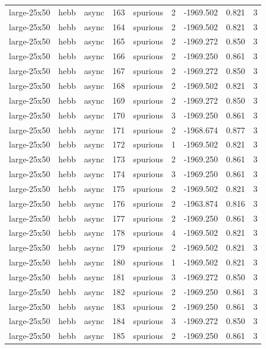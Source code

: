 \begin{tabular}{lllrlrrrr}
large-25x50 & hebb & async & 163 & spurious & 2 & -1969.502 & 0.821 & 3 \\
large-25x50 & hebb & async & 164 & spurious & 2 & -1969.502 & 0.821 & 3 \\
large-25x50 & hebb & async & 165 & spurious & 2 & -1969.272 & 0.850 & 3 \\
large-25x50 & hebb & async & 166 & spurious & 2 & -1969.250 & 0.861 & 3 \\
large-25x50 & hebb & async & 167 & spurious & 2 & -1969.272 & 0.850 & 3 \\
large-25x50 & hebb & async & 168 & spurious & 2 & -1969.502 & 0.821 & 3 \\
large-25x50 & hebb & async & 169 & spurious & 2 & -1969.272 & 0.850 & 3 \\
large-25x50 & hebb & async & 170 & spurious & 3 & -1969.250 & 0.861 & 3 \\
large-25x50 & hebb & async & 171 & spurious & 2 & -1968.674 & 0.877 & 3 \\
large-25x50 & hebb & async & 172 & spurious & 1 & -1969.502 & 0.821 & 3 \\
large-25x50 & hebb & async & 173 & spurious & 2 & -1969.250 & 0.861 & 3 \\
large-25x50 & hebb & async & 174 & spurious & 3 & -1969.250 & 0.861 & 3 \\
large-25x50 & hebb & async & 175 & spurious & 2 & -1969.502 & 0.821 & 3 \\
large-25x50 & hebb & async & 176 & spurious & 2 & -1963.874 & 0.816 & 3 \\
large-25x50 & hebb & async & 177 & spurious & 2 & -1969.250 & 0.861 & 3 \\
large-25x50 & hebb & async & 178 & spurious & 4 & -1969.502 & 0.821 & 3 \\
large-25x50 & hebb & async & 179 & spurious & 2 & -1969.502 & 0.821 & 3 \\
large-25x50 & hebb & async & 180 & spurious & 1 & -1969.502 & 0.821 & 3 \\
large-25x50 & hebb & async & 181 & spurious & 3 & -1969.272 & 0.850 & 3 \\
large-25x50 & hebb & async & 182 & spurious & 2 & -1969.250 & 0.861 & 3 \\
large-25x50 & hebb & async & 183 & spurious & 2 & -1969.250 & 0.861 & 3 \\
large-25x50 & hebb & async & 184 & spurious & 3 & -1969.272 & 0.850 & 3 \\
large-25x50 & hebb & async & 185 & spurious & 2 & -1969.250 & 0.861 & 3 \\

\end{tabular}
